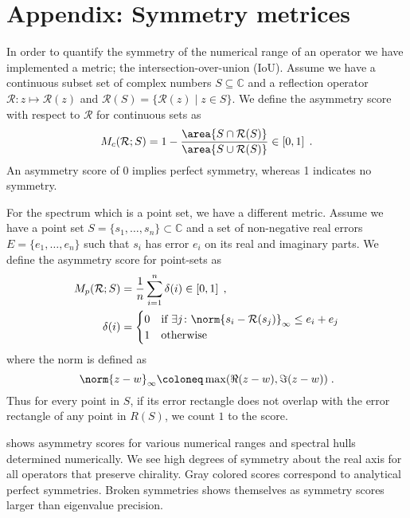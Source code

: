 \chapter{Appendix: Symmetry metrices}
\label{ch:appendix:symmetries}
\label{ch:appendix:D}


In order to quantify the symmetry of the numerical range of an operator we have implemented a metric; the intersection-over-union (IoU).
Assume we have a continuous subset set of complex numbers $S \subseteq \mathbb{C}$ and a reflection operator $\mathcal{R} \colon z \mapsto \mathcal{R}(z)$ and $\mathcal{R}(S) = \{ \mathcal{R}(z) \mid z \in S \} $.
We define the asymmetry score with respect to $\mathcal{R}$ for continuous sets as
\begin{equation} \label{eq:asymmetry:score:cont}
M_c(\mathcal{R}; S)
= 1-
\frac{\area{ S \cap \mathcal{R}(S) }}
     {\area{ S \cup \mathcal{R}(S) }}
\in \left[ 0, 1 \right] \;.
\end{equation}
An asymmetry score of \num{0} implies perfect symmetry, whereas \num{1} indicates no symmetry.

For the spectrum which is a point set, we have a different metric.
Assume we have a point set $S = \{s_1, \ldots, s_n\} \subset \mathbb{C}$ and a set of non-negative real errors $E = \{e_1, \ldots, e_n\}$ such that $s_i$ has error $e_i$ on its real and imaginary parts.
We define the asymmetry score for point-sets as
\begin{align} \label{eq:asymmetry:score:pt}
M_p(\mathcal{R}; S) &= \frac{1}{n} \sum_{i=1}^{n} \delta(i)
\in \left[ 0, 1 \right] \;, \\
\delta(i) &=
\begin{cases}
    0 & \text{if } \exists j \colon \norm{s_i - \mathcal{R}(s_j)}_{\infty} \leq e_i+e_j \\
    1 & \text{otherwise}
\end{cases}
\end{align}
where the norm is defined as
\begin{equation}
\norm{z - w}_{\infty} \coloneq \max(\Re(z - w), \Im(z - w)) \;.
\end{equation}
Thus for every point in $S$, if its error rectangle does not overlap with the error rectangle of any point in $R(S)$, we count $1$ to the score.

 shows asymmetry scores for various numerical ranges and spectral hulls determined numerically.
We see high degrees of symmetry about the real axis for all operators that preserve chirality.
Gray colored scores correspond to analytical perfect symmetries.
Broken symmetries shows themselves as symmetry scores larger than eigenvalue precision.

